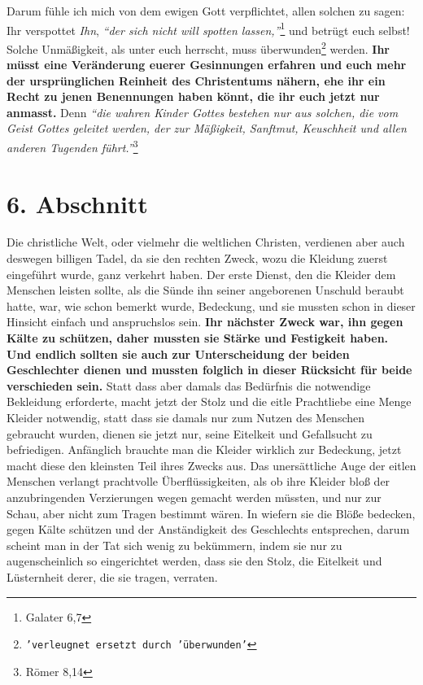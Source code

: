 \medskip

Darum fühle ich mich von dem ewigen Gott verpflichtet, allen solchen zu sagen:
Ihr verspottet \textit{Ihn},
\textit{"`der sich nicht will spotten lassen,"'}\footnote{Galater 6,7}
und betrügt euch selbst! Solche Unmäßigkeit, als unter
euch herrscht, muss
überwunden\footnote{\texttt{'verleugnet ersetzt durch 'überwunden'}} werden.
\label{ref:14_06_wahre_nachfolger_umkehr}
\textbf{Ihr müsst eine Veränderung euerer Gesinnungen erfahren und euch
mehr der ursprünglichen Reinheit des Christentums nähern, ehe ihr ein Recht zu
jenen Benennungen haben könnt, die ihr euch jetzt nur anmasst.}
 Denn
\textit{"`die wahren
Kinder Gottes bestehen nur aus solchen, die vom Geist Gottes geleitet werden,
der zur Mäßigkeit, Sanftmut, Keuschheit und allen anderen Tugenden
führt."'}\footnote{Römer 8,14}

\section{6. Abschnitt} \label{kap14_ab6}

Die christliche Welt, oder vielmehr die weltlichen
Christen,
verdienen aber auch
deswegen billigen Tadel, da sie den rechten Zweck, wozu die Kleidung zuerst
eingeführt wurde, ganz verkehrt haben. Der erste Dienst, den die Kleider dem
Menschen leisten sollte, als die Sünde ihn seiner angeborenen Unschuld beraubt
hatte, war, wie schon bemerkt wurde, Bedeckung, und sie mussten schon in dieser
Hinsicht einfach und anspruchslos sein. \textbf{Ihr nächster Zweck war, ihn
gegen Kälte
zu schützen, daher mussten sie Stärke und Festigkeit haben. Und endlich sollten
sie auch zur Unterscheidung der beiden Geschlechter dienen und mussten folglich
in dieser Rücksicht für beide verschieden sein.} Statt dass aber
damals das
Bedürfnis die notwendige Bekleidung erforderte, macht jetzt der Stolz und die
eitle Prachtliebe eine Menge Kleider notwendig, statt dass sie damals nur zum
Nutzen des Menschen gebraucht wurden, dienen sie jetzt nur, seine
Eitelkeit und
Gefallsucht zu befriedigen. Anfänglich brauchte man die Kleider wirklich zur
Bedeckung, jetzt macht diese den kleinsten Teil ihres Zwecks aus. Das
unersättliche Auge der eitlen Menschen verlangt prachtvolle Überflüssigkeiten,
als ob ihre Kleider bloß der anzubringenden Verzierungen wegen gemacht werden
müssten, und nur zur Schau, aber nicht zum Tragen bestimmt wären. In wiefern sie
die Blöße bedecken, gegen Kälte schützen und der Anständigkeit des Geschlechts
entsprechen, darum scheint man in der Tat sich wenig zu bekümmern, indem
sie nur zu augenscheinlich so eingerichtet werden, dass sie den Stolz, die
Eitelkeit und Lüsternheit derer, die sie tragen, verraten.

